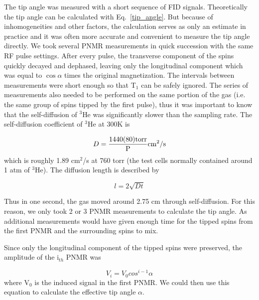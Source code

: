 The tip angle was measured with a short sequence of FID signals. Theoretically the tip angle can be calculated with Eq.~\ref{tip_angle}. But because of inhomogeneities and other factors, the calculation serves as only an estimate in practice and it was often more accurate and convenient to measure the tip angle directly. We took several PNMR measurements in quick succession with the same RF pulse settings. After every pulse, the transverse component of the spins quickly decayed and dephased, leaving only the longitudinal component which was equal to $\cos{\alpha}$ times the original magnetization. The intervals between measurements were short enough so that T$_{1}$ can be safely ignored. The series of measurements also needed to be performed on the same portion of the gas (i.e. the same group of spins tipped by the first pulse), thus it was important to know that the self-diffusion of $^{3}$He was significantly slower than the sampling rate. The self-diffusion coefficient of $^{3}$He at 300K is~\cite{J.Phys.France.35}

\begin{equation}
D=\frac{1440(80){\rm torr}}{{\rm P}}{\rm cm^{2}/s}
\end{equation}
which is roughly 1.89 cm$^{2}$/s at 760 torr (the test cells normally contained around 1 atm of $^{3}$He). The diffusion length is described by

\begin{equation}
l = 2\sqrt{Dt}
\end{equation}

Thus in one second, the gas moved around 2.75 cm through self-diffusion. For this reason, we only took 2 or 3 PNMR measurements to calculate the tip angle. As additional measurements would have given enough time for the tipped spins from the first PNMR and the surrounding spins to mix.

Since only the longitudinal component of the tipped spins were preserved, the amplitude of the i$_{th}$ PNMR was

\begin{equation}
V_{i}=V_{0}cos^{i-1}\alpha 
\end{equation}
where V$_{0}$ is the induced signal in the first PNMR. We could then use this equation to calculate the effective tip angle $\alpha$.






